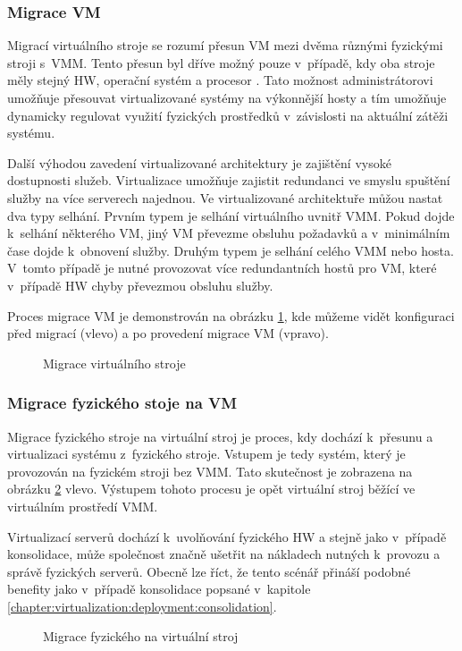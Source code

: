 \subsubsection{Migrace VM}
\label{chapter:virtualization:deployment:migration:virtual}
Migrací virtuálního stroje se rozumí přesun VM mezi dvěma různými fyzickými stroji s~VMM. Tento přesun byl dříve možný pouze
v~případě, kdy oba stroje měly stejný HW, operační systém a procesor \cite{oracle:virtualization:reasons}. Tato možnost administrátorovi
umožňuje přesouvat virtualizované systémy na výkonnější hosty a tím umožňuje dynamicky regulovat využití fyzických prostředků
v~závislosti na aktuální zátěži systému.

Další výhodou zavedení virtualizované architektury je zajištění vysoké dostupnosti služeb. Virtualizace umožňuje zajistit 
redundanci ve smyslu spuštění služby na více serverech najednou. Ve virtualizované architektuře můžou nastat dva typy selhání.
Prvním typem je selhání virtuálního uvnitř VMM. Pokud dojde k~selhání některého VM, jiný VM převezme obsluhu požadavků a
v~minimálním čase dojde k~obnovení služby. Druhým typem je selhání celého VMM nebo hosta. V~tomto případě je nutné provozovat
více redundantních hostů pro VM, které v~případě HW chyby převezmou obsluhu služby.

Proces migrace VM je demonstrován na obrázku \ref{figure:migration:virtual}, kde můžeme vidět konfiguraci před migrací
(vlevo) a po provedení migrace VM (vpravo).
\begin{figure}
    \centering    
    \caption{Migrace virtuálního stroje}
    \label{figure:migration:virtual}
\end{figure}
\subsubsection{Migrace fyzického stoje na VM}
\label{chapter:virtualization:deployment:migration:physical}
Migrace fyzického stroje na virtuální stroj je proces, kdy dochází k~přesunu a virtualizaci systému z~fyzického stroje.
Vstupem je tedy systém, který je provozován na fyzickém stroji bez VMM. Tato skutečnost je zobrazena na obrázku 
\ref{figure:migration:physical} vlevo. Výstupem tohoto procesu je opět virtuální stroj běžící ve virtuálním prostředí VMM.

Virtualizací serverů dochází k~uvolňování fyzického HW a stejně jako v~případě konsolidace, může společnost značně ušetřit
na nákladech nutných k~provozu a správě fyzických serverů. Obecně lze říct, že tento scénář přináší podobné benefity jako
v~případě konsolidace popsané v~kapitole \ref{chapter:virtualization:deployment:consolidation}.
\begin{figure}
    \centering    
    \caption{Migrace fyzického na virtuální stroj}
    \label{figure:migration:physical}
\end{figure}
